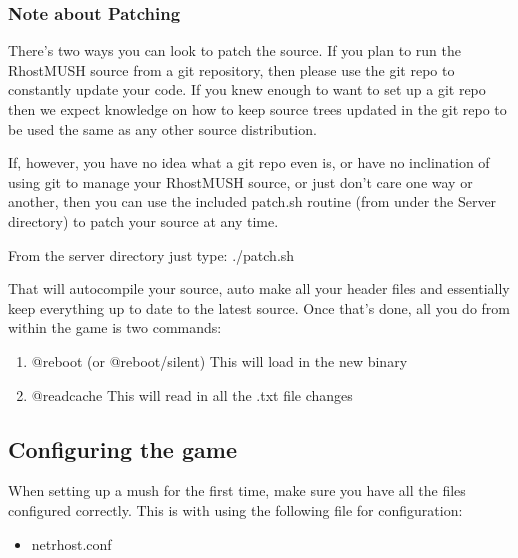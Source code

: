\documentclass[letterpaper,10pt,english]{sphinxmanual}
\begin{document}
\subsubsection{Note about Patching}
\label{\detokenize{installation:note-about-patching}}
\sphinxAtStartPar
There’s two ways you can look to patch the source.  If you plan to run the
RhostMUSH source from a git repository, then please use the git repo to
constantly update your code.  If you knew enough to want to set up a git repo
then we expect knowledge on how to keep source trees updated in the git repo
to be used the same as any other source distribution.

\sphinxAtStartPar
If, however, you have no idea what a git repo even is, or have no inclination
of using git to manage your RhostMUSH source, or just don’t care one way
or another, then you can use the included patch.sh routine (from under the
Server directory) to patch your source at any time.

\sphinxAtStartPar
From the server directory just type: ./patch.sh

\sphinxAtStartPar
That will auto\sphinxhyphen{}compile your source, auto make all your header files and
essentially keep everything up to date to the latest source.
Once that’s done, all you do from within the game is two commands:
\begin{enumerate}
%
\item {} 
\sphinxAtStartPar
@reboot (or @reboot/silent)  \textendash{} This will load in the new binary

\item {} 
\sphinxAtStartPar
@readcache  \textendash{} This will read in all the .txt file changes

\end{enumerate}


\subsection{Configuring the game}
\label{\detokenize{installation:configuring-the-game}}
\sphinxAtStartPar
When setting up a mush for the first time, make sure you
have all the files configured correctly.  This is with using
the following file for configuration:
\begin{itemize}
\item {} 
\sphinxAtStartPar
netrhost.conf

\end{itemize}
\end{document}

